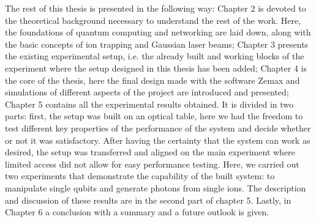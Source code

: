 \documentclass[english, a4paper, 12pt, twoside]{book}
\numberwithin{equation}{section} %
\begin{document}
The rest of this thesis is presented in the following way: Chapter 2 is devoted to the theoretical background necessary to understand the rest of the work. Here, the foundations of quantum computing and networking are laid down, along with the basic concepts of ion trapping and Gaussian laser beams; Chapter 3 presents the existing experimental setup, i.e. the already built and working blocks of the experiment where the setup designed in this thesis has been added; Chapter 4 is the core of the thesis, here the final design made with the software Zemax and simulations of different aspects of the project are introduced and presented; Chapter 5 contains all the experimental results obtained. It is divided in two parts: first, the setup was built on an optical table, here we had the freedom to test different key properties of the performance of the system and decide whether or not it was satisfactory. After having the certainty that the system can work as desired, the setup was transferred and aligned on the main experiment where limited access did not allow for easy performance testing. Here, we carried out two experiments that demonstrate the capability of the built system: to manipulate single qubits and generate photons from single ions. The description and discussion of these results are in the second part of chapter 5. Lastly, in Chapter 6 a conclusion with a summary and a future outlook is given.




%

%


%



\newpage




\newpage
\renewcommand{\appendixpagename}{Appendix} %
\renewcommand{\appendixtocname}{Appendix} %
\addappheadtotoc
\end{document}
